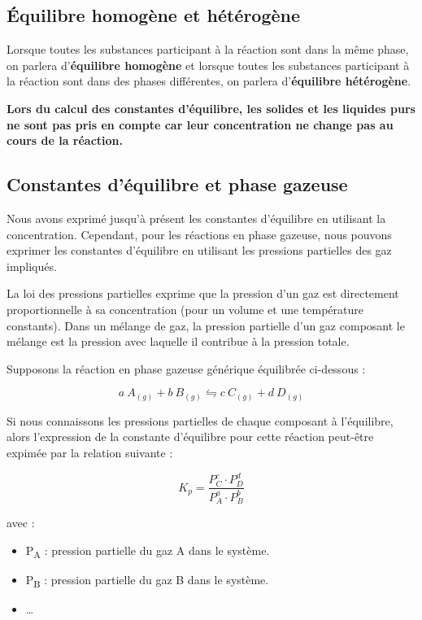 \documentclass[
  11pt,
  a4paper,
  openany]{book}
\providecommand{\tightlist}{%
  \setlength{\itemsep}{0pt}\setlength{\parskip}{0pt}}
\begin{document}
\subsection{Équilibre homogène et hétérogène}\label{uxe9quilibre-homoguxe8ne-et-huxe9tuxe9roguxe8ne}

Lorsque toutes les substances participant à la réaction sont dans la même phase, on parlera d'\textbf{équilibre homogène} et lorsque toutes les substances participant à la réaction sont dans des phases différentes, on parlera d'\textbf{équilibre hétérogène}.

\textbf{Lors du calcul des constantes d'équilibre, les solides et les liquides purs ne sont pas pris en compte car leur concentration ne change pas au cours de la réaction.}

\clearpage

\subsection{Constantes d'équilibre et phase gazeuse}\label{constantes-duxe9quilibre-et-phase-gazeuse}

Nous avons exprimé jusqu'à présent les constantes d'équilibre en utilisant la concentration. Cependant, pour les réactions en phase gazeuse, nous pouvons exprimer les constantes d'équilibre en utilisant les pressions partielles des gaz impliqués.

La loi des pressions partielles exprime que la pression d'un gaz est directement proportionnelle à sa concentration (pour un volume et une température constants). Dans un mélange de gaz, la pression partielle d'un gaz composant le mélange est la pression avec laquelle il contribue à la pression totale.

Supposons la réaction en phase gazeuse générique équilibrée ci-dessous :

\[
  a\ A_{(g)} + b\ B_{(g)} \leftrightharpoons c\ C_{(g)} + d\ D_{(g)}
\]

Si nous connaissons les pressions partielles de chaque composant à l'équilibre, alors l'expression de la constante d'équilibre pour cette réaction peut-être expimée par la relation suivante :

\[
  K_{p} = \frac{P_C^{c} \cdot P_D^{d}}{P_A^{a} \cdot P_B^{b}}
\]

avec :

\begin{itemize}
\tightlist
\item
  P\textsubscript{A} : pression partielle du gaz A dans le système.
\item
  P\textsubscript{B} : pression partielle du gaz B dans le système.
\item
  \ldots{}
\end{itemize}
\end{document}
